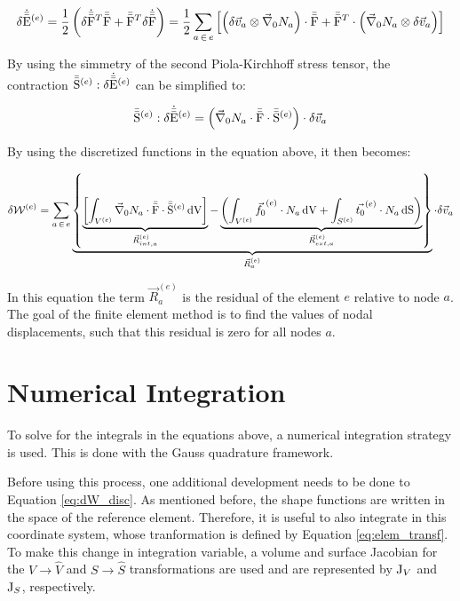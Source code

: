 \begin{equation*}
    \delta \dot{\bar{\bar{\mathrm{E}}}}^{(e)} = \frac{1}{2} \left( \delta \dot{\bar{\bar{\mathrm{F}}}}^T \bar{\bar{\mathrm{F}}} + \bar{\bar{\mathrm{F}}}^T \delta \dot{\bar{\bar{\mathrm{F}}}} \right) = \frac{1}{2} \sum_{a \, \in \, e} \left[ \left( \delta \vec{v}_a \otimes \vec{\nabla}_\mathrm{0} N_a \right) \cdot \bar{\bar{\mathrm{F}}} + \bar{\bar{\mathrm{F}}}^{T} \cdot \left(  \vec{\nabla}_\mathrm{0} N_a \otimes \delta \vec{v}_a \right) \right]
\end{equation*}

By using the simmetry of the second Piola-Kirchhoff stress tensor, the contraction $\bar{\bar{\mathrm{S}}}^{(e)} : \delta\dot{\bar{\bar{\mathrm{E}}}}^{(e)}$ can be simplified to:

\begin{equation*}
    \bar{\bar{\mathrm{S}}}^{(e)} : \delta\dot{\bar{\bar{\mathrm{E}}}}^{(e)} =  \left( \vec{\nabla}_\mathrm{0} N_a \cdot \bar{\bar{\mathrm{F}}} \cdot \bar{\bar{\mathrm{S}}}^{(e)} \right) \cdot  \delta \vec{v}_a
\end{equation*}

By using the discretized functions in the equation above, it then becomes:

\begin{equation} \label{eq:dW_disc}
    \delta \mathcal{W}^{(e)} = \sum_{a \, \in \, e} \underbrace{\left\{ \underbrace{\left[ \int_{V^{(e)}} \vec{\nabla}_\mathrm{0} N_a \cdot \bar{\bar{\mathrm{F}}} \cdot \bar{\bar{\mathrm{S}}}^{(e)} \, \mathrm{dV} \right]}_{\vec{R}_{int, a}^{(e)}} - \underbrace{ \left(\int_{V^{(e)}} \vec{f_0}^{(e)} \cdot N_a  \, \mathrm{dV} + \int_{S^{(e)}} \vec{t_0}^{(e)} \cdot N_a \, \mathrm{dS} \right)}_{\vec{R}_{ext, a}^{(e)}} \right\}}_{\vec{R}_a^{(e)}} \cdot \delta \vec{v}_a
\end{equation}

In this equation the term $\vec{R}_a^{(e)}$ is the residual of the element $e$ relative to node $a$. The goal of the finite element method is to find the values of nodal displacements, such that this residual is zero for all nodes $a$.

\section{Numerical Integration}

To solve for the integrals in the equations above, a numerical integration strategy is used. This is done with the Gauss quadrature framework. 

Before using this process, one additional development needs to be done to Equation \ref{eq:dW_disc}. As mentioned before, the shape functions are written in the space of the reference element. Therefore, it is useful to also integrate in this coordinate system, whose tranformation is defined by Equation \ref{eq:elem_transf}. To make this change in integration variable, a volume and surface Jacobian for the $V \longrightarrow \hat V$ and $S \longrightarrow \hat S$ transformations are used and are represented by $\mathrm{J}_V$ and $\mathrm{J}_S$, respectively. 

